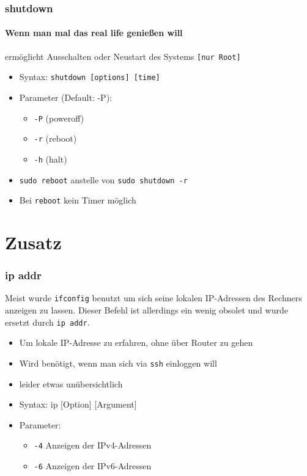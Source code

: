 \documentclass[12pt,utf8]{beamer}
\begin{document}
\begin{frame}
\frametitle{shutdown}
\framesubtitle{\textcolor{ownDarkOr}{Wenn man mal das real life genießen will}}
ermöglicht Ausschalten oder Neustart des Systems \texttt{[nur Root]}
\begin{itemize}
	\item Syntax: \texttt{shutdown [options] [time]}
	\item Parameter (Default: -P):
	\begin{itemize}[<+->]
		\item \texttt{-P} (poweroff)
		\item \texttt{-r} (reboot) 
		\item \texttt{-h} (halt)
	\end{itemize}
	\item \texttt{sudo reboot} anstelle von \texttt{sudo shutdown -r}
	\item Bei \texttt{reboot} kein Timer möglich
\end{itemize}
\end{frame}

\section{Zusatz}
\begin{frame}
\frametitle{ip addr}
Meist wurde \texttt{ifconfig} benutzt um sich seine lokalen IP-Adressen des Rechners anzeigen zu lassen. Dieser Befehl ist allerdings ein wenig obsolet und wurde ersetzt durch \texttt{ip addr}.
\begin{itemize}
	\item Um lokale IP-Adresse zu erfahren, ohne über Router zu gehen
	\item Wird benötigt, wenn man sich via \texttt{ssh} einloggen will
	\item leider etwas unübersichtlich
	\item Syntax: ip [Option] [Argument]
	\item Parameter:
	\begin{itemize}[<+->]
		\item \texttt{-4} Anzeigen der IPv4-Adressen
		\item \texttt{-6} Anzeigen der IPv6-Adressen
	\end{itemize}
\end{itemize}
\end{frame}
\end{document}
